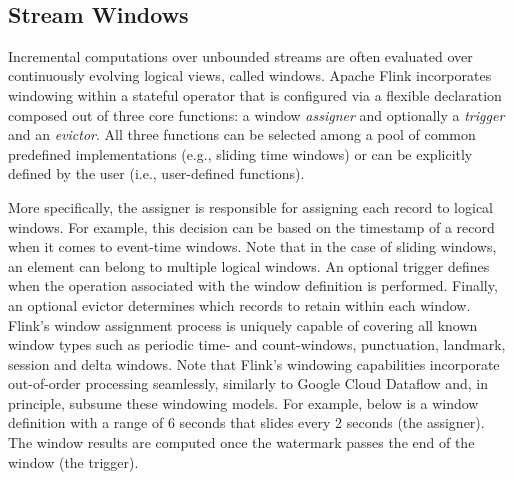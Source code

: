 \documentclass[11pt]{article}
\begin{document}

 

\subsection{Stream Windows}
\vspace{-2mm}
Incremental computations over unbounded streams are often evaluated over continuously evolving logical views, called windows. Apache Flink incorporates windowing within a stateful operator that is configured via a flexible declaration composed out of three core functions: a window \textit{assigner} and optionally a \textit{trigger} and an \textit{evictor}. All three functions can be selected among a pool of common predefined implementations (e.g., sliding time windows) or can be explicitly defined by the user (i.e., user-defined functions).

More specifically, the assigner is responsible for assigning each record to logical windows. For example, this decision can be based on the timestamp of a record when it comes to event-time windows. Note that in the case of sliding windows, an element can belong to multiple logical windows. An optional trigger defines when the operation associated with the window definition is performed. Finally, an optional evictor determines which records to retain within each window. Flink's window assignment process is uniquely capable of covering all known window types such as periodic time- and count-windows, punctuation, landmark, session and delta windows. Note that Flink's windowing capabilities incorporate out-of-order processing seamlessly, similarly to Google Cloud Dataflow \cite{akidau2015dataflow} and, in principle, subsume these windowing models. For example, below is a window definition with a range of 6 seconds that slides every 2 seconds (the assigner). The window results are computed once the watermark passes the end of the window (the trigger).
\end{document}
